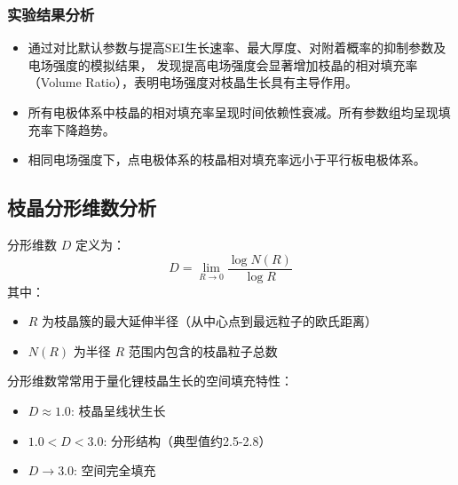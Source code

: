 \documentclass{article}
\begin{document}
\subsubsection{实验结果分析}
\begin{itemize}
\item 通过对比默认参数与提高SEI生长速率、最大厚度、对附着概率的抑制参数及电场强度的模拟结果，
发现提高电场强度会显著增加枝晶的相对填充率（Volume Ratio），表明电场强度对枝晶生长具有主导作用。
\item 
所有电极体系中枝晶的相对填充率呈现时间依赖性衰减。所有参数组均呈现填充率下降趋势。
\item 
相同电场强度下，点电极体系的枝晶相对填充率远小于平行板电极体系。
\end{itemize}




 \subsection{枝晶分形维数分析}

 分形维数 \( D \) 定义为：
 \[
 D = \lim_{R \to 0} \frac{\log N(R)}{\log R}
 \]
 其中：
 \begin{itemize}
     \item \( R \) 为枝晶簇的最大延伸半径（从中心点到最远粒子的欧氏距离）
     \item \( N(R) \) 为半径 \( R \) 范围内包含的枝晶粒子总数
 \end{itemize}
 
分形维数常常用于量化锂枝晶生长的空间填充特性：
 \begin{itemize}
     \item \( D \approx 1.0 \): 枝晶呈线状生长
     \item \( 1.0 < D < 3.0 \): 分形结构（典型值约2.5-2.8）
     \item \( D \to 3.0 \): 空间完全填充
 \end{itemize}
\end{document}
